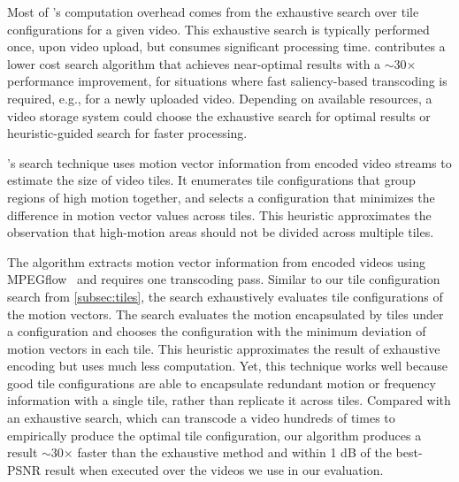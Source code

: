 Most of \name's computation overhead comes from the exhaustive search over tile configurations for a given video.
This exhaustive search is typically performed once, upon video upload, but consumes significant processing time.
\nameStore contributes a lower cost search algorithm that achieves near-optimal results with a $\sim$30$\times$ performance improvement, for situations where fast saliency-based transcoding is required, e.g., for a newly uploaded video.
Depending on available resources, a video storage system could choose the exhaustive search for optimal results or heuristic-guided search for faster processing.

\name's search technique uses motion vector information from encoded video streams to estimate the size of video tiles.
It enumerates tile configurations that group regions of high motion together, and selects a configuration that minimizes the difference in motion vector values across tiles.
This heuristic approximates the observation that high-motion areas should not be divided across multiple tiles.

The algorithm extracts motion vector information from encoded videos using {{MPEGflow}}~\cite{mpegflow} and requires one transcoding pass.
Similar to our tile configuration search from \ref{subsec:tiles}, the search exhaustively evaluates tile configurations of the motion vectors.
The search evaluates the motion encapsulated by tiles under a configuration and chooses the configuration with the minimum deviation of motion vectors in each tile.
This heuristic approximates the result of exhaustive encoding but uses much less computation.
Yet, this technique works well because good tile configurations are able to encapsulate redundant motion or frequency information with a single tile, rather than replicate it across tiles.
Compared with an exhaustive search, which can transcode a video hundreds of times to empirically produce the optimal tile configuration, our algorithm produces a result $\sim$30$\times$ faster than the exhaustive method and within 1 dB of the best-PSNR result when executed over the videos we use in our evaluation.

